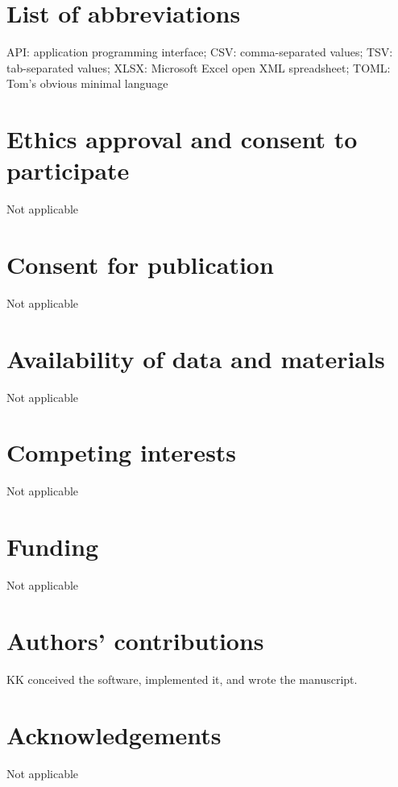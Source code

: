 \documentclass[twocolumn]{bmcart}
\begin{document}
\section*{List of abbreviations }

API: application programming interface; CSV: comma-separated values;
TSV: tab-separated values; XLSX: Microsoft Excel open XML spreadsheet;
TOML: Tom's obvious minimal language


\begin{backmatter}

\section*{Ethics approval and consent to participate }
Not applicable

\section*{Consent for publication }
Not applicable

\section*{Availability of data and materials }
Not applicable

\section*{Competing interests}
Not applicable

\section*{Funding }
Not applicable

\section*{Authors' contributions}
KK conceived the software, implemented it, and wrote the manuscript.

\section*{Acknowledgements }
Not applicable


\end{backmatter}
\end{document}
